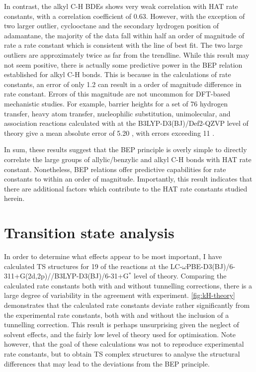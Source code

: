 In contrast, the alkyl C-H BDEs shows very weak correlation with HAT rate constants, with a correlation coefficient of 0.63. However, with the exception of two larger outlier, cyclooctane and the secondary hydrogen position of adamantane, the majority of the data fall within half an order of magnitude of rate a rate constant which is consistent with the line of best fit. The two large outliers are approximately twice as far from the trendline. While this result may not seem positive, there is actually some predictive power in the BEP relation established for alkyl C-H bonds. This is because in the calculations of rate constants, an error of only 1.2 \kcalmol can result in a order of magnitude difference in rate constant. Errors of this magnitude are not uncommon for DFT-based mechanistic studies. For example, barrier heights for a set\cite{Zhao2005, Zhao2009} of 76 hydrogen transfer, heavy atom transfer, nucleophilic substitution, unimolecular, and association reactions calculated with at the B3LYP-D3(BJ)/Def2-QZVP level of theory give a mean absolute error of 5.20 \kcalmol, with errors exceeding 11 \kcalmol.\cite{Goerigk2011}

In sum, these results suggest that the BEP principle is overly simple to directly correlate the large groups of allylic/benzylic and alkyl C-H bonds with HAT rate constant. Nonetheless, BEP relations offer predictive capabilities for rate constants to within an order of magnitude. Importantly, this result indicates that there are additional factors which contribute to the HAT rate constants studied herein.

\section{Transition state analysis}

In order to determine what effects appear to be most important, I have calculated TS structures for 19 of the reactions at the LC-$\omega$PBE-D3(BJ)/6-311+G(2d,2p)//B3LYP-D3(BJ)/6-31+G$^*$ level of theory. Comparing the calculated rate constants both with and without tunnelling corrections, there is a large degree of variability in the agreement with experiment. \ref{fig:kH-theory} demonstrates that the calculated rate constants deviate rather significantly from the experimental rate constants, both with and without the inclusion of a tunnelling correction. This result is perhaps unsurprising given the neglect of solvent effects, and the fairly low level of theory used for optimisation. Note however, that the goal of these calculations was not to reproduce experimental rate constants, but to obtain TS complex structures to analyse the structural differences that may lead to the deviations from the BEP principle.

